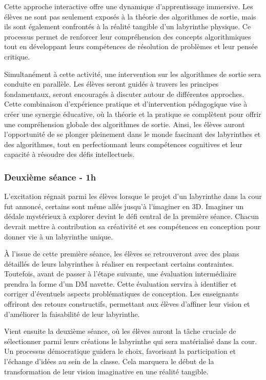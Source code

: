 Cette approche interactive offre une dynamique d'apprentissage immersive. Les élèves ne sont pas seulement exposés à la théorie des
algorithmes de sortie, mais ils sont également confrontés à la réalité tangible d'un labyrinthe physique. Ce processus permet de renforcer
leur compréhension des concepts algorithmiques tout en développant leurs compétences de résolution de problèmes et leur pensée critique.

Simultanément à cette activité, une intervention sur les algorithmes de sortie sera conduite en parallèle.
Les élèves seront guidés à travers les principes fondamentaux, seront encouragés à discuter autour de différentes approches.
Cette combinaison d'expérience pratique et d'intervention pédagogique vise à créer une synergie éducative, où la théorie et la pratique
se complètent pour offrir une compréhension globale des algorithmes de sortie. Ainsi, les élèves auront l'opportunité de se plonger
pleinement dans le monde fascinant des labyrinthes et des algorithmes, tout en perfectionnant leurs compétences cognitives
et leur capacité à résoudre des défis intellectuels.
\subsubsection*{Deuxième séance - 1h}



L'excitation régnait parmi les élèves lorsque le projet d'un labyrinthe dans la cour fut annoncé, certains sont même allés jusqu'à l'imaginer en 3D.
Imaginer un dédale mystérieux à explorer devint le défi central de la première séance. Chacun devrait mettre à contribution sa créativité
et ses compétences en conception pour donner vie à un labyrinthe unique.

À l'issue de cette première séance, les élèves se retrouveront avec des plans détaillés de leurs labyrinthes à réaliser en respectant certains contraintes.
Toutefois, avant de passer à l'étape suivante, une évaluation intermédiaire prendra la forme d'un DM navette. Cette évaluation servira
à identifier et corriger d'éventuels aspects problématiques de conception. Les enseignants offriront des retours constructifs, permettant
aux élèves d'affiner leur vision et d'améliorer la faisabilité de leur labyrinthe.

Vient ensuite la deuxième séance, où les élèves auront la tâche cruciale de sélectionner parmi leurs créations le labyrinthe qui sera
matérialisé dans la cour. Un processus démocratique guidera le choix, favorisant la participation et l'échange d'idées au sein de la classe.
Cela marquera le début de la transformation de leur vision imaginative en une réalité tangible.

